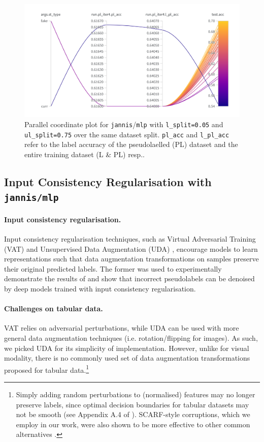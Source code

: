 \documentclass{article}
\begin{document}
\begin{figure}[htbp]
  \centering
  \includegraphics[width=\columnwidth]{par_coords_jannis_mlp_simul_noise.png}
  \caption{
    Parallel coordinate plot for \texttt{jannis}/\texttt{mlp} with
    \texttt{l\_split=0.05} and \texttt{ul\_split=0.75} over the same dataset split.
    \texttt{pl\_acc} and \texttt{l\_pl\_acc} refer to the label accuracy of the
    pseudolaelled (PL) dataset and the entire training dataset (L \& PL) resp..
  }
  \label{fig:par_coords_jannis_mlp_simul_noise}
\end{figure}

\subsection{Input Consistency Regularisation with \texttt{jannis/mlp}}
\label{sec:icr_jannis_mlp}

\paragraph{Input consistency regularisation.}
Input consistency regularisation techniques, such as Virtual Adversarial Training (VAT)
\cite{miyato2018virtual} and Unsupervised Data Augmentation (UDA)
\cite{xie2020unsupervised}, encourage models to learn representations such that data
augmentation transformations on samples preserve their original predicted labels.
The former was used to experimentally demonstrate the results of
\textcite{wei2022theoretical} and show that incorrect pseudolabels can be denoised by
deep models trained with input consistency regularisation.

\paragraph{Challenges on tabular data.}
VAT relies on adversarial perturbations, while UDA can be used with more general data
augmentation techniques (i.e. rotation/flipping for images).
As such, we picked UDA for its simplicity of implementation.
However, unlike for visual modality, there is no commonly used set of data augmentation
transformations proposed for tabular data.\footnote{%
  Simply adding random perturbations to (normalised) features may no longer preserve
  labels, since optimal decision boundaries for tabular datasets may not be smooth (see
  Appendix A.4 of \cite{grinsztajn2022why}).
  SCARF-style corruptions, which we employ in our work, were also shown to be more
  effective to other common alternatives \cite{bahri2022scarf}.
}
\end{document}

